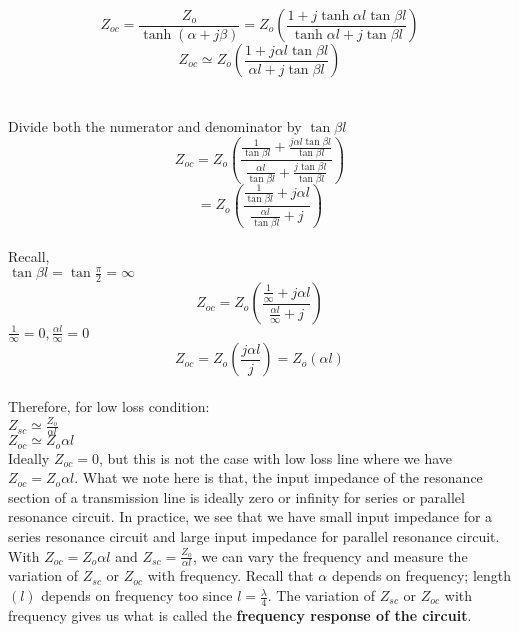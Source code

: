 	\begin{equation}
	Z_{oc} = \frac{Z_{o}}{\tanh(\alpha+j\beta)}=Z_{o}\left(\frac{1+j\tanh \alpha l\tan \beta l}{\tanh \alpha l+j\tan \beta l}\right)
	\end{equation}
	\begin{equation}
	Z_{oc} \simeq Z_{o}\left(\frac{1+ j \alpha l\tan \beta l}{\alpha l+j\tan \beta l}\right)
	\end{equation}\\\\
	Divide both the numerator and denominator by $ \tan \beta l $
	\begin{equation}
	Z_{oc}=Z_{o}\left(\frac{\frac{1}{\tan \beta l}+\frac{j \alpha l\tan \beta l}{\tan \beta l}}{\frac{\alpha l}{\tan \beta l}+\frac{j\tan \beta l}{\tan \beta l}}\right)
	\end{equation}
	\begin{equation}
	=Z_{o}\left(\frac{\frac{1}{\tan \beta l} + j \alpha l}{\frac{\alpha l}{\tan \beta l} + j}\right)
	\end{equation}\\
	Recall,\\
	$ \tan\beta l =\tan\frac{\pi}{2}=\infty $\\
	\begin{equation}
	Z_{oc}=Z_{o}\left(\frac{\frac{1}{\infty} + j \alpha l}{\frac{\alpha l}{\infty} + j}\right)
	\end{equation}
	$ \frac{1}{\infty}=0, \frac{\alpha l}{\infty}=0 $\\
	\begin{equation}
	\boxed{	Z_{oc}=Z_{o}\left(\frac{j \alpha l}{j}\right)=Z_{o}(\alpha l)}\end{equation}\\
	Therefore, for low loss condition:\\
	 $ Z_{sc}\simeq \frac{Z_{o}}{\alpha l} $\\
	$ Z_{oc} \simeq Z_{o} \alpha l $\\ 
	
	Ideally $ Z_{oc}=0 $, but this is not the case with low loss line where we have  $ Z_{oc} = Z_{o} \alpha l $. What we note here is that, the input impedance of the resonance section of a transmission line is ideally zero or infinity for series or parallel resonance circuit. In practice, we see that we have small input impedance for a series resonance circuit and large input impedance for parallel resonance circuit.\\
	
	With $ Z_{oc} =  Z_{o} \alpha l $ and  
	$ Z_{sc}= \frac{Z_{o}}{\alpha l} $, we can vary the frequency and measure the variation of $ Z_{sc} $ or $ Z_{oc} $ with frequency. Recall that $ \alpha $ depends on frequency; length $(l)$ depends on frequency too since  $ l=\frac{\lambda}{4} $. The variation of $ Z_{sc} $  or  $ Z_{oc} $ with frequency gives us what is called the \textbf{frequency response of the circuit}.\\
	
